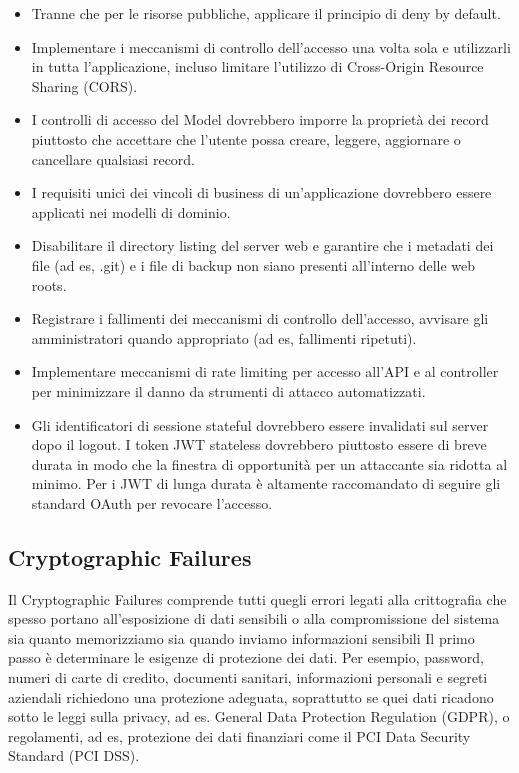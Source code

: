 \begin{itemize}
    \item Tranne che per le risorse pubbliche, applicare il principio di deny by default.
    \item Implementare i meccanismi di controllo dell'accesso una volta sola e utilizzarli in tutta l'applicazione, incluso limitare l'utilizzo di Cross-Origin Resource Sharing (CORS).
    \item I controlli di accesso del Model dovrebbero imporre la proprietà dei record piuttosto che accettare che l'utente possa creare, leggere, aggiornare o cancellare qualsiasi record.
    \item I requisiti unici dei vincoli di business di un'applicazione dovrebbero essere applicati nei modelli di dominio.
    \item Disabilitare il directory listing del server web e garantire che i metadati dei file (ad es, .git) e i file di backup non siano presenti all'interno delle web roots.
    \item Registrare i fallimenti dei meccanismi di controllo dell'accesso, avvisare gli amministratori quando appropriato (ad es, fallimenti ripetuti).
    \item Implementare meccanismi di rate limiting per accesso all'API e al controller per minimizzare il danno da strumenti di attacco automatizzati.
    \item Gli identificatori di sessione stateful dovrebbero essere invalidati sul server dopo il logout. I token JWT stateless dovrebbero piuttosto essere di breve durata in modo che la finestra di opportunità per un attaccante sia ridotta al minimo. Per i JWT di lunga durata è altamente raccomandato di seguire gli standard OAuth per revocare l'accesso.
\end{itemize}

\subsection{Cryptographic Failures} 

Il Cryptographic Failures comprende tutti quegli errori legati alla crittografia che spesso portano all'esposizione di dati sensibili o alla compromissione del sistema sia quanto memorizziamo sia quando inviamo informazioni sensibili
Il primo passo è determinare le esigenze di protezione dei dati. Per esempio, password, numeri di carte di credito, documenti sanitari, informazioni personali e segreti aziendali richiedono una protezione adeguata, soprattutto se quei dati ricadono sotto le leggi sulla privacy, ad es. General Data Protection Regulation (GDPR), o regolamenti, ad es, protezione dei dati finanziari come il PCI Data Security Standard (PCI DSS). 

